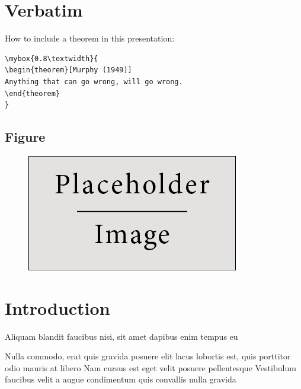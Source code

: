 \documentclass[
paper=landscape,
paper=160mm:90mm, %
fontsize=11pt, %
pagesize, %
parskip=half-, %
]{scrartcl} %
\theoremstyle{mythmstyle} %
\newtheorem{theorem}{Theorem}[section] %
\newcommand*{\mybox}[2]{%
  \par\noindent
  \begin{tikzpicture}[mynodestyle/.style={rectangle,draw=myblue,thick,inner sep=2mm,text justified,top color=white,bottom color=white,above}]
    \node[mynodestyle,at={(0.5*#1+2mm+0.4pt,0)}]{%
      \begin{minipage}[t]{#1}
      #2
      \end{minipage}%
    };
  \end{tikzpicture}
\par\vspace{-1.3em}}
\begin{document}







\section*{Verbatim}

How to include a theorem in this presentation:
\begin{verbatim}
\mybox{0.8\textwidth}{
\begin{theorem}[Murphy (1949)]
Anything that can go wrong, will go wrong.
\end{theorem}
}
\end{verbatim}

\clearpage




\subsection*{Figure}

\begin{figure}[h]
\centering\includegraphics[width=0.4\linewidth]{placeholder}
\end{figure}

\clearpage




\section{Introduction}


\begin{outline}

\1 Aliquam blandit faucibus nisi, sit amet dapibus enim tempus eu

\2 Nulla commodo, erat quis gravida posuere
\1 elit lacus lobortis est, quis porttitor odio mauris at libero
\1 Nam cursus est eget velit posuere pellentesque
\1 Vestibulum faucibus velit a augue condimentum quis convallis nulla gravida

\end{outline}
\end{document}
